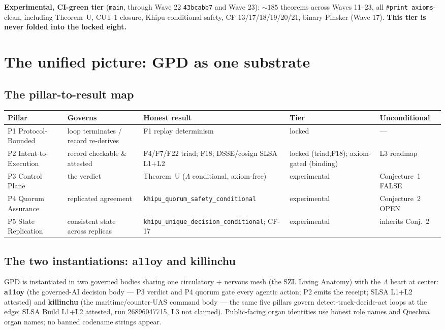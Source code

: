 \documentclass[11pt,letterpaper]{article}
\theoremstyle{definition}
\newcommand{\Lam}{\Lambda}
\begin{document}
\textbf{Experimental, CI-green tier} (\texttt{main}, through Wave 22
\texttt{43bcabb7} and Wave 23): ${\sim}185$ theorems across Waves 11--23, all
\texttt{\#print axioms}-clean, including Theorem~U, CUT-1 closure, Khipu
conditional safety, CF-13/17/18/19/20/21, binary Pinsker (Wave 17). \textbf{This
tier is never folded into the locked eight.}

\section{The unified picture: GPD as one substrate}

\subsection{The pillar-to-result map}
\begin{center}\small
\begin{tabular}{@{}p{2.4cm}p{3.0cm}p{3.4cm}p{2.0cm}p{2.4cm}@{}}
\toprule
\textbf{Pillar} & \textbf{Governs} & \textbf{Honest result} & \textbf{Tier} & \textbf{Unconditional} \\
\midrule
P1 Protocol-Bounded & loop terminates / record re-derives & F1 replay determinism & locked & --- \\
P2 Intent-to-Execution & record checkable \& attested & F4/F7/F22 triad; F18; DSSE/cosign SLSA L1+L2 & locked (triad,F18); axiom-gated (binding) & L3 roadmap \\
P3 Control Plane & the verdict & Theorem~U ($\Lam$ conditional, axiom-free) & experimental & Conjecture~1 FALSE \\
P4 Quorum Assurance & replicated agreement & \texttt{khipu\_quorum\_safety\_conditional} & experimental & Conjecture~2 OPEN \\
P5 State Replication & consistent state across replicas & \texttt{khipu\_unique\_decision\_conditional}; CF-17 & experimental & inherits Conj.~2 \\
\bottomrule
\end{tabular}
\end{center}

\subsection{The two instantiations: a11oy and killinchu}
GPD is instantiated in two governed bodies sharing one circulatory + nervous mesh
(the SZL Living Anatomy) with the $\Lam$ heart at center: \textbf{a11oy} (the
governed-AI decision body --- P3 verdict and P4 quorum gate every agentic action;
P2 emits the receipt; SLSA L1+L2 attested) and \textbf{killinchu} (the
maritime/counter-UAS command body --- the same five pillars govern
detect-track-decide-act loops at the edge; SLSA Build L1+L2 attested, run
26896047715, L3 not claimed). Public-facing organ identities use honest role
names and Quechua organ names; no banned codename strings appear.
\end{document}
